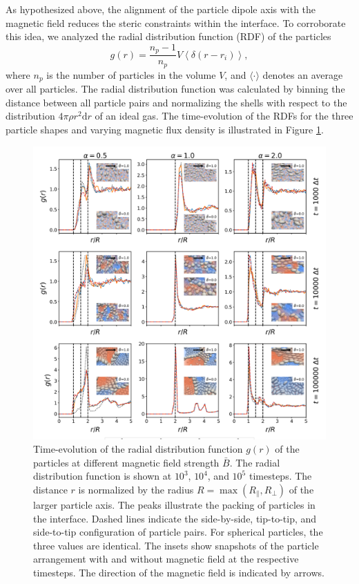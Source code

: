 As hypothesized above, the alignment of the particle dipole axis with
the magnetic field reduces the steric constraints within the interface.
To corroborate this idea, we analyzed the radial distribution function
(RDF) of the particles
%
\begin{equation}
g(r) = \frac{n_p-1}{n_p} V \left\langle\delta\left(r-r_i\right)\right\rangle ,
\end{equation}
%
where \(n_p\) is the number of particles in the volume
\(V\), and \(\langle\cdot\rangle\) denotes an average over all
particles. The radial distribution function was calculated by binning
the distance between all particle pairs and normalizing the shells with
respect to the distribution \(4\pi \rho r^2 \mathrm{d}r\) of an ideal
gas. The time-evolution of the RDFs for the three particle shapes and
varying magnetic flux density is illustrated in Figure \ref{fig:rdf}.

\begin{figure}
\centering
\includegraphics[width=\textwidth]{figures/results/paper1/rdf_compare_time.png}
\caption{Time-evolution of the radial distribution function $g(r)$ of the particles at different magnetic field strength $\bar{B}$. The radial distribution function is shown at $10^3$, $10^4$, and $10^5$ timesteps. The distance $r$ is normalized by the radius $R=\max(R_\parallel,R_\perp)$ of the larger particle axis. The peaks illustrate the packing of particles in the interface. Dashed lines indicate the side-by-side, tip-to-tip, and side-to-tip configuration of particle pairs. For spherical particles, the three values are identical. The insets show snapshots of the particle arrangement with and without magnetic field at the respective timesteps. The direction of the magnetic field is indicated by arrows.}
\label{fig:rdf}
\end{figure}

